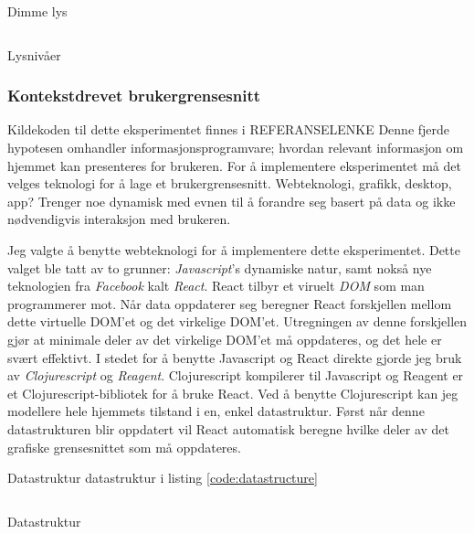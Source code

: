 \begin{listing}[ht]
\inputminted[fontsize=\footnotesize, linenos]{python}{kodesnutter/dimming.py}
\label{code:dim}
\caption{Dimme lys}
\end{listing}

\begin{listing}[ht]
\inputminted[fontsize=\footnotesize, linenos]{python}{kodesnutter/lighting.py}
\label{code:light}
\caption{Lysnivåer}
\end{listing}

\subsubsection{Kontekstdrevet brukergrensesnitt}
{\color{red}Kildekoden til dette eksperimentet finnes i REFERANSELENKE}
Denne fjerde hypotesen omhandler informasjonsprogramvare; hvordan relevant informasjon om hjemmet kan presenteres for brukeren. For å implementere eksperimentet må det velges teknologi for å lage et brukergrensesnitt. Webteknologi, grafikk, desktop, app? Trenger noe dynamisk med evnen til å forandre seg basert på data og ikke nødvendigvis interaksjon med brukeren.

Jeg valgte å benytte webteknologi for å implementere dette eksperimentet. Dette valget ble tatt av to grunner: \emph{Javascript}'s dynamiske natur, samt nokså nye teknologien fra \emph{Facebook} kalt \emph{React}. React tilbyr et viruelt \emph{DOM} som man programmerer mot. Når data oppdaterer seg beregner React forskjellen mellom dette virtuelle DOM'et og det virkelige DOM'et. Utregningen av denne forskjellen gjør at minimale deler av det virkelige DOM'et må oppdateres, og det hele er svært effektivt. I stedet for å benytte Javascript og React direkte gjorde jeg bruk av \emph{Clojurescript} og \emph{Reagent}. Clojurescript kompilerer til Javascript og Reagent er et Clojurescript-bibliotek for å bruke React. Ved å benytte Clojurescript kan jeg modellere hele hjemmets tilstand i en, enkel datastruktur. Først når denne datastrukturen blir oppdatert vil React automatisk beregne hvilke deler av det grafiske grensesnittet som må oppdateres.

{\color{red}Datastruktur}
datastruktur i listing \ref{code:datastructure}

\begin{listing}[ht]
\inputminted[fontsize=\footnotesize, linenos]{clj}{kodesnutter/data.clj}
\caption{Datastruktur}
\label{code:datastructure}
\end{listing}

